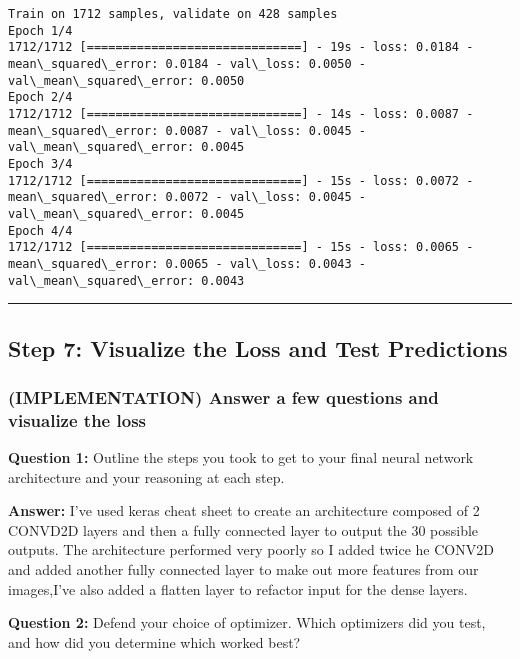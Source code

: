 \documentclass[11pt]{article}
\begin{document}
    \begin{Verbatim}[commandchars=\\\{\}]
Train on 1712 samples, validate on 428 samples
Epoch 1/4
1712/1712 [==============================] - 19s - loss: 0.0184 - mean\_squared\_error: 0.0184 - val\_loss: 0.0050 - val\_mean\_squared\_error: 0.0050
Epoch 2/4
1712/1712 [==============================] - 14s - loss: 0.0087 - mean\_squared\_error: 0.0087 - val\_loss: 0.0045 - val\_mean\_squared\_error: 0.0045
Epoch 3/4
1712/1712 [==============================] - 15s - loss: 0.0072 - mean\_squared\_error: 0.0072 - val\_loss: 0.0045 - val\_mean\_squared\_error: 0.0045
Epoch 4/4
1712/1712 [==============================] - 15s - loss: 0.0065 - mean\_squared\_error: 0.0065 - val\_loss: 0.0043 - val\_mean\_squared\_error: 0.0043

    \end{Verbatim}

    \begin{center}\rule{0.5\linewidth}{\linethickness}\end{center}

\hypertarget{step-7-visualize-the-loss-and-test-predictions}{%
\subsection{Step 7: Visualize the Loss and Test
Predictions}\label{step-7-visualize-the-loss-and-test-predictions}}

    \hypertarget{implementation-answer-a-few-questions-and-visualize-the-loss}{%
\subsubsection{(IMPLEMENTATION) Answer a few questions and visualize the
loss}\label{implementation-answer-a-few-questions-and-visualize-the-loss}}

\textbf{Question 1:} Outline the steps you took to get to your final
neural network architecture and your reasoning at each step.

\textbf{Answer:} I've used keras cheat sheet to create an architecture
composed of 2 CONVD2D layers and then a fully connected layer to output
the 30 possible outputs. The architecture performed very poorly so I
added twice he CONV2D and added another fully connected layer to make
out more features from our images,I've also added a flatten layer to
refactor input for the dense layers.

\textbf{Question 2:} Defend your choice of optimizer. Which optimizers
did you test, and how did you determine which worked best?
\end{document}
